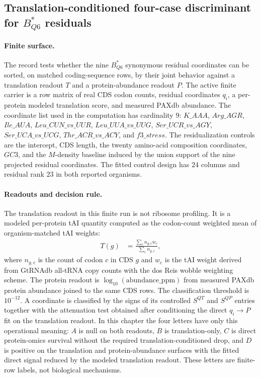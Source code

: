 \subsection{Translation-conditioned four-case discriminant for $B^{*}_{Q6}$ residuals}
\label{sec:bioreality-q6-fourcase-discriminant}

\paragraph{Finite surface.}
The record tests whether the nine $B^{*}_{Q6}$ synonymous residual coordinates can be sorted, on matched coding-sequence rows, by their joint behavior against a translation readout $T$ and a protein-abundance readout $P$.  The active finite carrier is a row matrix of real CDS codon counts, residual coordinates $q_i$, a per-protein modeled translation score, and measured PAXdb abundance.  The coordinate list used in the computation has cardinality $9$:
$K\_AAA$, $Arg\_AGR$, $Ile\_AUA$, $Leu\_CUN\_vs\_UUR$, $Leu\_UUA\_vs\_UUG$, $Ser\_UCR\_vs\_AGY$, $Ser\_UCA\_vs\_UCG$, $Thr\_ACR\_vs\_ACY$, and $f3\_stress$.  The residualization controls are the intercept, CDS length, the twenty amino-acid composition coordinates, $GC3$, and the $M$-density baseline induced by the union support of the nine projected residual coordinates.  The fitted control design has $24$ columns and residual rank $23$ in both reported organisms.

\paragraph{Readouts and decision rule.}
The translation readout in this finite run is not ribosome profiling.  It is a modeled per-protein tAI quantity computed as the codon-count weighted mean of organism-matched tAI weights:
$$
\begin{aligned}
T(g) &= \frac{\sum_{c} n_{g,c} w_c}{\sum_c n_{g,c}},
\end{aligned}
$$
where $n_{g,c}$ is the count of codon $c$ in CDS $g$ and $w_c$ is the tAI weight derived from GtRNAdb all-tRNA copy counts with the dos Reis wobble weighting scheme.  The protein readout is $\log_{10}(\mathrm{abundance\_ppm})$ from measured PAXdb protein abundance joined to the same CDS rows.  The classification threshold is $10^{-12}$.  A coordinate is classified by the signs of its controlled $S^{QT}$ and $S^{QP}$ entries together with the attenuation test obtained after conditioning the direct $q_i \to P$ fit on the translation readout.  In this chapter the four letters have only this operational meaning: $A$ is null on both readouts, $B$ is translation-only, $C$ is direct protein-omics survival without the required translation-conditioned drop, and $D$ is positive on the translation and protein-abundance surfaces with the fitted direct signal reduced by the modeled translation readout.  These letters are finite-row labels, not biological mechanisms.

